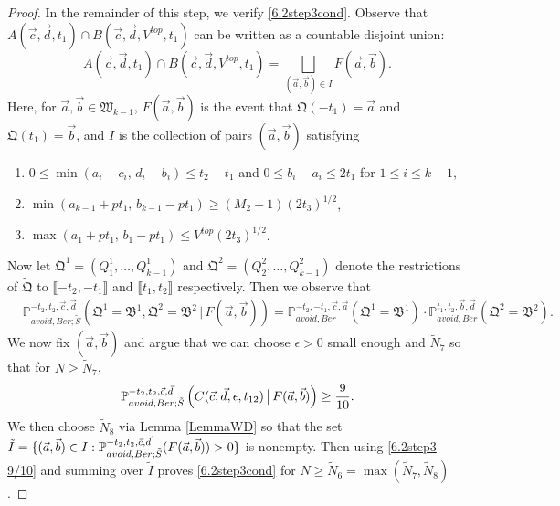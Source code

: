 \begin{proof}
	In the remainder of this step, we verify \eqref{6.2step3cond}. Observe that $A(\vec{c},\vec{d},t_1) \cap B(\vec{c},\vec{d},V^{top},t_1)$ can be written as a countable disjoint union: 
	\begin{equation}\label{6.2step3disj}
	A(\vec{c},\vec{d},t_1) \cap B(\vec{c},\vec{d},V^{top},t_1) = \bigsqcup_{(\vec{a},\vec{b})\in I} F(\vec{a},\vec{b}).
	\end{equation}
	Here, for $\vec{a},\vec{b}\in\mathfrak{W}_{k-1}$, $F(\vec{a},\vec{b})$ is the event that $\mathfrak{Q}(-t_1) = \vec{a}$ and $\mathfrak{Q}(t_1) = \vec{b}$, and $I$ is the collection of pairs $(\vec{a},\vec{b})$ satisfying
	\begin{enumerate}[label = (\arabic*)]
		
		\item $ 0 \leq \min(a_i - c_i,\, d_i - b_i) \leq t_2 - t_1$ and $0\leq b_i-a_i \leq 2t_1$ for $1\leq i\leq k-1$,
		
		\item $\min(a_{k-1} + pt_1,\, b_{k-1} - pt_1) \geq (M_2+1)(2t_3)^{1/2}$,
		
		\item $\max(a_1 + pt_1,\, b_1 - pt_1) \leq V^{top}(2t_3)^{1/2}$.
		
	\end{enumerate}
	Now let $\mathfrak{Q}^1 = (Q^1_1,\dots,Q^1_{k-1})$ and $\mathfrak{Q}^2 = (Q^2_2,\dots,Q^2_{k-1})$ denote the restrictions of $\tilde{\mathfrak{Q}}$ to $\llbracket -t_2,-t_1\rrbracket$ and $\llbracket t_1,t_2\rrbracket$ respectively. Then we observe that
	\begin{equation}\label{6.2step3ind}
	\begin{split}
	&\mathbb{P}^{-t_2,t_2,\vec{c},\vec{d}}_{avoid, Ber; \tilde S}\left(\mathfrak{Q}^1 = \mathfrak{B}^1, \mathfrak{Q}^2 = \mathfrak{B}^2\,\big|\,F(\vec{a},\vec{b})\right) = \mathbb{P}^{-t_2,-t_1,\vec{c},\vec{a}}_{avoid, Ber}\left(\mathfrak{Q}^1 = \mathfrak{B}^1\right) \cdot \mathbb{P}^{t_1,t_2,\vec{b},\vec{d}}_{avoid, Ber}\left(\mathfrak{Q}^2 = \mathfrak{B}^2\right).
	\end{split}
	\end{equation}
	We now fix $(\vec{a},\vec{b})$ and argue that we can choose $\epsilon > 0$ small enough and $\tilde{N}_7$ so that for $N\geq\tilde{N}_7$,
	\begin{equation}\label{6.2step3 9/10}
	\mathbb{P}^{-t_2,t_2,\vec c, \vec d}_{avoid,Ber;\tilde{S}}\left(C(\vec{c},\vec{d},\epsilon,t_{12})\,\big|\, F(\vec{a},\vec{b})\right) \geq \frac{9}{10}.
	\end{equation}
	We then choose $\tilde{N}_8$ via Lemma \ref{LemmaWD} so that the set $\tilde{I} = \{(\vec{a},\vec{b})\in I : \mathbb{P}^{-t_2,t_2,\vec c, \vec d}_{avoid,Ber;\tilde{S}}(F(\vec{a},\vec{b})) > 0\}$ is nonempty. Then using \eqref{6.2step3 9/10} and summing over $\tilde{I}$ proves \eqref{6.2step3cond} for $N\geq\tilde{N}_6 = \max(\tilde{N}_7,\tilde{N}_8)$.
	

\end{proof}
